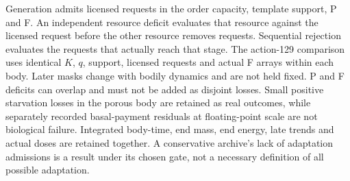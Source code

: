 Generation admits licensed requests in the order capacity, template support, P and F. An independent resource deficit evaluates that resource against the licensed request before the other resource removes requests. Sequential rejection evaluates the requests that actually reach that stage. The action-129 comparison uses identical $K$, $q$, support, licensed requests and actual F arrays within each body. Later masks change with bodily dynamics and are not held fixed. P and F deficits can overlap and must not be added as disjoint losses. Small positive starvation losses in the porous body are retained as real outcomes, while separately recorded basal-payment residuals at floating-point scale are not biological failure. Integrated body-time, end mass, end energy, late trends and actual doses are retained together. A conservative archive's lack of adaptation admissions is a result under its chosen gate, not a necessary definition of all possible adaptation.

